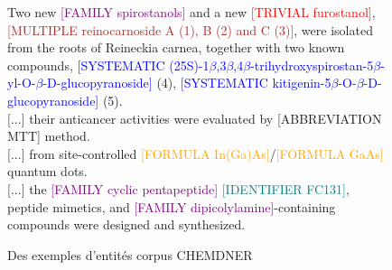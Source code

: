 \documentclass[12pt,a4paper,times,twoside,openright]{report}
\newenvironment{helvetica}{\fontfamily{ppl}\selectfont}{\par}
\begin{document}
\begin{figure}[ht!]
\begin{helvetica}
\small
Two new \textcolor{purple}{[FAMILY spirostanols]} and a new \textcolor{red}{[TRIVIAL furostanol]}, \textcolor{brown}{[MULTIPLE reinocarnoside A (1), B (2) and C (3)]}, were isolated from the roots of Reineckia carnea, together with two known compounds, \textcolor{blue}{[SYSTEMATIC (25S)-1$\beta$,3$\beta$,4$\beta$-trihydroxyspirostan-5$\beta$-yl-O-$\beta$-D-glucopyranoside]} (4), \textcolor{blue}{[SYSTEMATIC kitigenin-5$\beta$-O-$\beta$-D-glucopyranoside]} (5). \\
$[$...$]$ their anticancer activities were evaluated by \textcolor{green!50!black}{[ABBREVIATION MTT]} method. \\
$[$...$]$ from site-controlled \textcolor{orange}{[FORMULA In(Ga)As]}/\textcolor{orange}{[FORMULA GaAs]} quantum dots. \\
$[$...$]$ the \textcolor{purple}{[FAMILY cyclic pentapeptide]} \textcolor{teal}{[IDENTIFIER FC131]}, peptide mimetics, and \textcolor{purple}{[FAMILY dipicolylamine]}-containing compounds were designed and synthesized.
\end{helvetica}
\caption{Des exemples d'entités corpus CHEMDNER}
\label{fig:CHEMDNER-examples}
\end{figure}

\end{document}

